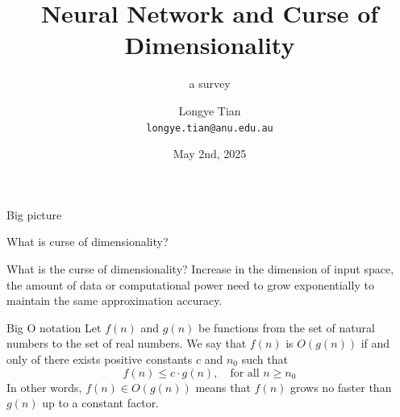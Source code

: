 \documentclass[aspectratio=169]{beamer} %
\title[NN]{Neural Network and Curse of Dimensionality}
\subtitle{a survey}
\author[Longye]{Longye Tian \\ \texttt{longye.tian@anu.edu.au}}
\institute[ANU]{Australian National University\\ School of Economics}
\date{May 2nd, 2025}
\begin{document}
\begin{frame}
  \titlepage
\end{frame}

\begin{frame}{Big picture}
    
\end{frame}
\begin{frame}{What is curse of dimensionality?}
    
\end{frame}

\begin{frame}{What is the curse of dimensionality?}
    Increase in the dimension of input space, the amount of data or computational power need to grow exponentially to maintain the same approximation accuracy. 
\end{frame}

\begin{frame}{Big O notation}
Let $f(n)$ and $g(n)$ be functions from the set of natural numbers to the set of real numbers. We say that $f(n)$ is $O(g(n))$ if and only of there exists positive constants $c$ and $n_0$ such that
$$
f(n) \le c\cdot g(n),\quad\text{for all $n\ge n_0$}
$$
In other words, $f(n) \in O(g(n))$ means that $f(n)$ grows no faster than $g(n)$ up to a constant factor. 
\end{frame}
\end{document}
